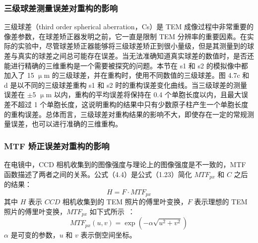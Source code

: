 \subsubsection{三级球差测量误差对重构的影响}
三级球差（third order spherical aberration，Cs）是 TEM 成像过程中非常重要的像差参数，在球差矫正器发明之前，它一直是限制 TEM 分辨率的重要因素。在实际的实验中，尽管球差矫正器能够将三级球差矫正到很小量级，但是其测量到的球差与真实的球差之间总可能存在误差。当无法准确知道真实球差的数值时，是否还能进行精确的三维重构是一个需要被探究的问题。本节在 s1 和 s2 的模拟像中都加入了 15 $\upmu$m 的三级球差，并在重构时，使用不同数值的三级球差。图 4.7c 和 d 是以不同的三级球差重构 s1 和 s2 时的重构误差变化曲线。当三级球差的测量误差在 $\pm$5 $\upmu$m 以内，重构的平均误差将保持在 0.4 个单胞长度以内，且最大误差不超过 1 个单胞长度，这说明重构的结果中只有少数原子柱产生一个单胞长度的重构误差。总体而言，三级球差对重构结果的影响不大，即使存在一定的常规测量误差，也可以进行准确的三维重构。

\subsubsection{MTF 矫正误差对重构的影响}

在电镜中，CCD 相机收集到的图像强度与理论上的图像强度是不一致的，MTF 函数描述了两者之间的关系。公式（4.4）是公式（1.23）简化 $MTF_{px}$ 和 $C$ 之后的结果：
\begin{equation}
H=F \cdot \textit{MTF}_{px}
\end{equation}
其中 $H$ 表示 $CCD$ 相机收集到的 TEM 照片的傅里叶变换，$F$ 表示理想的 TEM 照片的傅里叶变换，$\textit{MTF}_{px}$ 如下式所示~\cite{VanBroek2012}：
\begin{equation}
\textit{MTF}_{px}(u,v)=\exp\left(-\alpha \sqrt{u^2+v^2}\right)
\end{equation}
$\alpha$ 是可变的参数，$u$ 和 $v$ 表示倒空间坐标。



